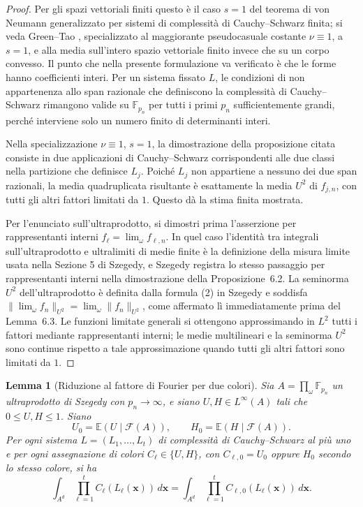 \documentclass[11pt]{article}
\numberwithin{equation}{section}
\newtheorem{lemma}[theorem]{Lemma}
\newcommand{\E}{\mathbb E}
\newcommand{\F}{\mathbb F}
\newcommand{\1}{\mathbf 1}
\newcommand{\calF}{\mathcal F}
\begin{document}
\begin{proof}
Per gli spazi vettoriali finiti questo è il caso \(s=1\) del teorema di von Neumann generalizzato per sistemi di complessità di Cauchy--Schwarz finita; si veda Green--Tao \cite[Proposition 7.1]{GreenTaoPrimes}, specializzato al maggiorante pseudocasuale costante \(\nu\equiv1\), a \(s=1\), e alla media sull'intero spazio vettoriale finito invece che su un corpo convesso. Il punto che nella presente formulazione va verificato è che le forme hanno coefficienti interi. Per un sistema fissato \(L\), le condizioni di non appartenenza allo span razionale che definiscono la complessità di Cauchy--Schwarz rimangono valide su \(\F_{p_n}\) per tutti i primi \(p_n\) sufficientemente grandi, perché interviene solo un numero finito di determinanti interi.

Nella specializzazione \(\nu\equiv1\), \(s=1\), la dimostrazione della proposizione citata consiste in due applicazioni di Cauchy--Schwarz corrispondenti alle due classi nella partizione che definisce \(L_j\). Poiché \(L_j\) non appartiene a nessuno dei due span razionali, la media quadruplicata risultante è esattamente la media \(U^2\) di \(f_{j,n}\), con tutti gli altri fattori limitati da \(1\). Questo dà la stima finita mostrata.

Per l'enunciato sull'ultraprodotto, si dimostri prima l'asserzione per rappresentanti interni \(f_\ell=\lim_\omega f_{\ell,n}\). In quel caso l'identità tra integrali sull'ultraprodotto e ultralimiti di medie finite è la definizione della misura limite usata nella Sezione 5 di Szegedy, e Szegedy registra lo stesso passaggio per rappresentanti interni nella dimostrazione della Proposizione~6.2. La seminorma \(U^2\) dell'ultraprodotto è definita dalla formula (2) in Szegedy e soddisfa \(\|\lim_\omega f_n\|_{U^2}=\lim_\omega\|f_n\|_{U^2}\), come affermato lì immediatamente prima del Lemma~6.3. Le funzioni limitate generali si ottengono approssimando in \(L^2\) tutti i fattori mediante rappresentanti interni; le medie multilineari e la seminorma \(U^2\) sono continue rispetto a tale approssimazione quando tutti gli altri fattori sono limitati da \(1\).
\end{proof}

\begin{lemma}[Riduzione al fattore di Fourier per due colori]
\label{lem:two-colour-factor-reduction}
Sia \(A=\prod_\omega\F_{p_n}\) un ultraprodotto di Szegedy con \(p_n\to\infty\), e siano \(U,H\in L^\infty(A)\) tali che \(0\le U,H\le1\). Siano
\[
        U_0=\E(U\mid\calF(A)),
        \qquad
        H_0=\E(H\mid\calF(A)).
\]
Per ogni sistema \(L=(L_1,\ldots,L_t)\) di complessità di Cauchy--Schwarz al più uno e per ogni assegnazione di colori \(C_\ell\in\{U,H\}\), con \(C_{\ell,0}=U_0\) oppure \(H_0\) secondo lo stesso colore, si ha
\[
        \int_{A^d}\prod_{\ell=1}^t C_\ell(L_\ell(\mathbf x))\,d\mathbf x
        =
        \int_{A^d}\prod_{\ell=1}^t C_{\ell,0}(L_\ell(\mathbf x))\,d\mathbf x.
\]
\end{lemma}
\end{document}
